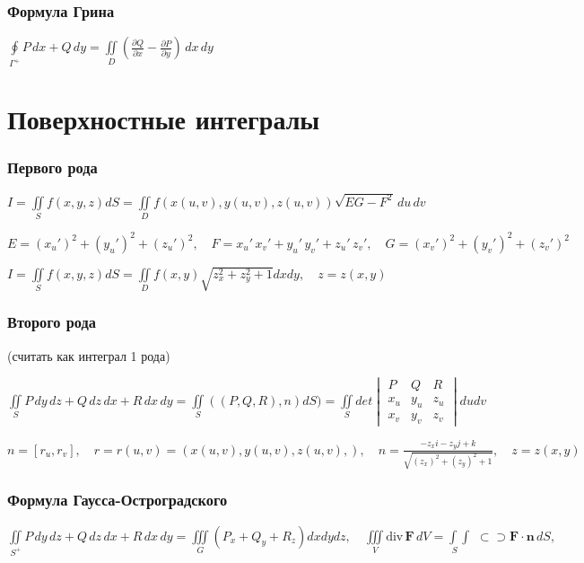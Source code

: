 \subsubsection{Формула Грина}
$\oint\limits_{\Gamma ^{+}} P \,dx + Q \,dy = \iint\limits_{D} \left( \frac{\partial Q}{\partial x} - \frac{\partial P}{\partial y} \right) \,dx\,dy$

\section{Поверхностные интегралы}
\subsubsection{Первого рода} 
${ I=\iint \limits _{S}{f\left(x, y, z\right)dS }=\iint \limits _{D}{f\left(x\left(u,v\right),y\left(u,v\right),z\left(u,v\right)\right){\sqrt {EG-F^{2}}}\,du\,dv}}$

${ E=\left(x_{u}'\right)^{2}+\left(y_{u}'\right)^{2}+\left(z_{u}'\right)^{2}}, \quad {F=x_{u}'\,x_{v}'+y_{u}'\,y_{v}'+z_{u}'\,z_{v}'}, \quad { G=\left(x_{v}'\right)^{2}+\left(y_{v}'\right)^{2}+\left(z_{v}'\right)^{2}}$

$ I=\iint \limits _{S}{f\left(x, y, z\right)dS } = \iint \limits _{D} f(x,y) \sqrt {z_x^2 + z_y^2 + 1}dxdy, \quad z=z(x, y) $

\subsubsection{Второго рода} 

\qquad  \qquad  \qquad \qquad \qquad \qquad \qquad \qquad \qquad (считать как интеграл 1 рода)

${\iint \limits _{S }{P\,dy\,dz+Q\,dz\,dx+R\,dx\,dy}} = {\iint \limits _{S }{((P,Q,R),n)}dS}) = \iint \limits _{S}{det \begin{vmatrix}P&Q&R\\x_u&y_u&z_u\\x_v&y_v&z_v\end{vmatrix}}dudv$


$n = [r_u, r_v], \quad r = r(u,v) = (x(u,v), y(u,v), z(u,v),) , \quad n = \frac{-z_x i-z_y j+k}{\sqrt{(z_x)^2 + (z_y)^2 + 1}}, \quad z = z(x,y)$


\subsubsection{Формула Гаусса-Остроградского}
${\iint \limits _{S^{+}}{P\,dy\,dz+Q\,dz\,dx+R\,dx\,dy}} = {\iiint \limits _{G} \left(P_x + Q_y + R_z\right)dxdydz}, \quad \iiint\limits_V\mathrm{div}\,\mathbf{F}\,dV=\int\limits_{\,\,S}\!\!\!\!\int\!\!\!\!\!\!\!\!\!\!\!\!\,\!\!\,\subset\!\!\supset\mathbf F\cdot\mathbf{n}\,dS,$

